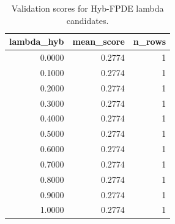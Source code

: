 \begin{table}[t]
\caption{Validation scores for Hyb-FPDE lambda candidates.}
\label{tab:lambda_distribution_computed}
\centering
\begin{tabular}{rrr}
\toprule
lambda\_hyb & mean\_score & n\_rows \\
\midrule
0.0000 & 0.2774 & 1 \\
0.1000 & 0.2774 & 1 \\
0.2000 & 0.2774 & 1 \\
0.3000 & 0.2774 & 1 \\
0.4000 & 0.2774 & 1 \\
0.5000 & 0.2774 & 1 \\
0.6000 & 0.2774 & 1 \\
0.7000 & 0.2774 & 1 \\
0.8000 & 0.2774 & 1 \\
0.9000 & 0.2774 & 1 \\
1.0000 & 0.2774 & 1 \\
\bottomrule
\end{tabular}

\end{table}
